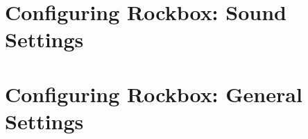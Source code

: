 \chapter{Configuring Rockbox:  Sound Settings}
\label{ref:configure_rockbox_sound}
	
	
\chapter{Configuring Rockbox:  General Settings}
\label{ref:configure_rockbox_general}
  
    
    
    
    
    
    
    